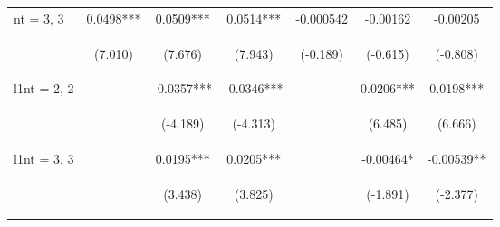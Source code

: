 \documentclass[]{article}
\begin{document}
\begin{center}
\begin{tabular}{lcccccc}
nt = 3, 3 & 0.0498*** & 0.0509*** & 0.0514*** & -0.000542 & -0.00162 & -0.00205 \\
\vspace{4pt} & \begin{footnotesize}(7.010)\end{footnotesize} & \begin{footnotesize}(7.676)\end{footnotesize} & \begin{footnotesize}(7.943)\end{footnotesize} & \begin{footnotesize}(-0.189)\end{footnotesize} & \begin{footnotesize}(-0.615)\end{footnotesize} & \begin{footnotesize}(-0.808)\end{footnotesize} \\
l1nt = 2, 2 &  & -0.0357*** & -0.0346*** &  & 0.0206*** & 0.0198*** \\
\vspace{4pt} & \begin{footnotesize}\end{footnotesize} & \begin{footnotesize}(-4.189)\end{footnotesize} & \begin{footnotesize}(-4.313)\end{footnotesize} & \begin{footnotesize}\end{footnotesize} & \begin{footnotesize}(6.485)\end{footnotesize} & \begin{footnotesize}(6.666)\end{footnotesize} \\
l1nt = 3, 3 &  & 0.0195*** & 0.0205*** &  & -0.00464* & -0.00539** \\
\vspace{4pt} & \begin{footnotesize}\end{footnotesize} & \begin{footnotesize}(3.438)\end{footnotesize} & \begin{footnotesize}(3.825)\end{footnotesize} & \begin{footnotesize}\end{footnotesize} & \begin{footnotesize}(-1.891)\end{footnotesize} & \begin{footnotesize}(-2.377)\end{footnotesize} \\

\end{tabular}
\end{center}
\end{document}
